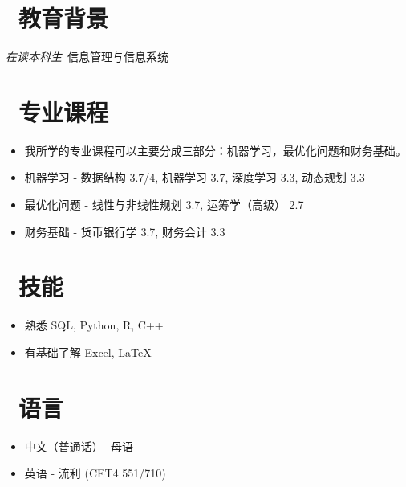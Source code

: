 \documentclass{resume}
\begin{document}


 
\section{\faGraduationCap\  教育背景}
\textit{在读本科生}\ 信息管理与信息系统

\section{\faUsers\ 专业课程}
\begin{itemize}[parsep=0.5ex]
  \item 我所学的专业课程可以主要分成三部分：机器学习，最优化问题和财务基础。
  \item 机器学习 - 数据结构 3.7/4, 机器学习 3.7, 深度学习 3.3, 动态规划 3.3
  \item 最优化问题 - 线性与非线性规划 3.7, 运筹学（高级） 2.7
  \item 财务基础 - 货币银行学 3.7, 财务会计 3.3
\end{itemize}
  
\section{\faCogs\ 技能}
\begin{itemize}[parsep=0.5ex]
  \item 熟悉 SQL, Python, R, C++
  \item 有基础了解 Excel, LaTeX
\end{itemize}

\section{\faInfo\ 语言}
\begin{itemize}[parsep=0.5ex]
  \item 中文（普通话）- 母语
  \item 英语 - 流利 (CET4 551/710)
\end{itemize}


%
%
\end{document}
